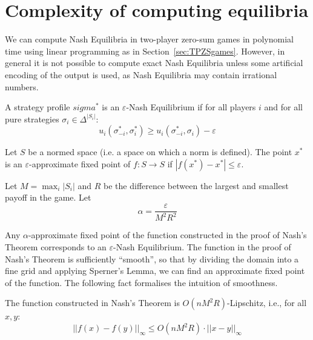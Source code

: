 \section{Complexity of computing equilibria}
We can compute Nash Equilibria in two-player zero-sum games in polynomial time
using linear programming as in Section~\ref{sec:TPZSgames}. However, in general
it is not possible to compute exact Nash Equilibria unless some artificial
encoding of the output is used, as Nash Equilibria may contain irrational
numbers.

\begin{definition}
	A strategy profile $
	sigma^*$ is an $\varepsilon$-Nash Equilibrium if for all players $i$ and
	for all pure strategies $\sigma_i \in \Delta^{|S_i|}$:
	\begin{equation}
		u_i(\sigma^*_{-i}, \sigma^*_i) \ge u_i(\sigma^*_{-i}, \sigma_i) - \varepsilon
	\end{equation}
\end{definition}

\begin{definition}
	Let $S$ be a normed space (i.e. a space on which a norm is defined). The
	point $x^*$ is an $\varepsilon$-approximate fixed point of $f:S \rightarrow
	S$ if $|f(x^*) - x^*| \le \varepsilon$.
\end{definition}

Let $M = \max_i |S_i|$ and $R$ be the difference between the largest and
smallest payoff in the game. Let
\begin{equation}
	\alpha = \frac{\varepsilon}{M^2 R^2}
\end{equation}

Any $\alpha$-approximate fixed point of the function constructed in the proof
of Nash's Theorem corresponds to an $\varepsilon$-Nash Equilibrium. The
function in the proof of Nash's Theorem is sufficiently ``smooth'', so that by
dividing the domain into a fine grid and applying Sperner's Lemma, we can find
an approximate fixed point of the function. The following fact formalises the
intuition of smoothness.

\begin{fact}
	\label{fact:Lipschitz}
	The function constructed in Nash's Theorem is $O(nM^2R)$-Lipschitz, i.e.,
	for all $x, y$:
	\begin{equation}
		||f(x) - f(y)||_\infty \le O(nM^2R) \cdot ||x - y||_\infty
	\end{equation}
\end{fact}

